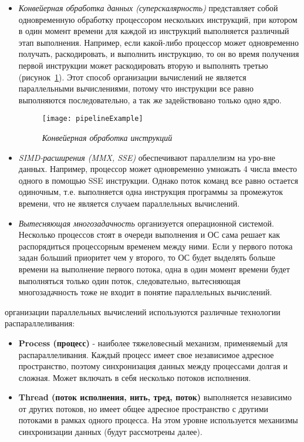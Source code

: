 {\begin{itemize}
			\item\textit{Конвейерная обработка данных (суперскалярность)} представляет собой одновременную обработку процессором нескольких инструкций, при котором в один момент времени для каждой из инструкций выполняется различный этап выполнения. Например, если какой-либо процессор может одновременно получать, раскодировать, и выполнить инструкцию, то он во время получения первой инструкции может раскодировать вторую и выполнять третью (рисунок~\ref{pipelineExample:image}). Этот способ организации вычислений не является параллельными вычислениями, потому что инструкции все равно выполняются последовательно, а так же задействовано только одно ядро.
				\begin{figure}[H]
					\texttt{[image: pipelineExample]}
					\caption{\textit{Конвейерная обработка инструкций}}
					\label{pipelineExample:image}
				\end{figure}
			\item\textit{SIMD-расширения (MMX, SSE)} обеспечивают параллелизм на уро-вне данных. Например, процессор может одновременно умножать 4 числа вместо одного в помощью SSE инструкции. Однако поток команд все равно остается одиночным, т.е. выполняется одна инструкция программы за промежуток времени, что не является случаем параллельных вычислений.
			\item\textit{Вытесняющая многозадачность} организуется операционной системой. Несколько процессов стоят в очереди выполнения и ОС сама решает как распорядиться процессорным временем между ними. Если у первого потока задан больший приоритет чем у второго, то ОС будет выделять больше времени на выполнение первого потока, одна в один момент времени будет выполняться только один поток, следовательно, вытесняющая многозадачность тоже не входит в понятие параллельных вычислений.
		\end{itemize}
	 организации параллельных вычислений используются различные технологии распараллеливания:
		\begin{itemize}
			\item\textbf{Process (процесс)} - наиболее тяжеловесный механизм, применяемый для распараллеливания. Каждый процесс имеет свое независимое адресное пространство, поэтому синхронизация данных между процессами долгая и сложная. Может включать в себя несколько потоков исполнения.
			\item\textbf{Thread (поток исполнения, нить, тред, поток)} выполняется независимо от других потоков, но имеет общее адресное пространство с другими потоками в рамках одного процесса. На этом уровне используется механизмы синхронизации данных (будут рассмотрены далее).

\end{itemize}}
